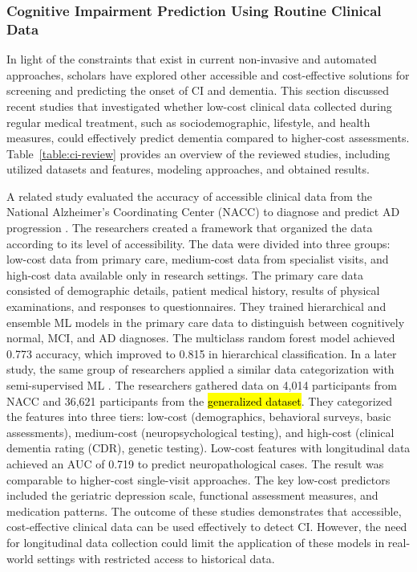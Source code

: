 \subsubsection{Cognitive Impairment Prediction Using Routine Clinical Data}
\label{sec:similar-studies}
In light of the constraints that exist in current non-invasive and automated approaches, scholars have explored other accessible and cost-effective solutions for screening and predicting the onset of CI and dementia. This section discussed recent studies that investigated whether low-cost clinical data collected during regular medical treatment, such as sociodemographic, lifestyle, and health measures, could effectively predict dementia compared to higher-cost assessments. Table~\ref{table:ci-review} provides an overview of the reviewed studies, including utilized datasets and features, modeling approaches, and obtained results.

A related study evaluated the accuracy of accessible clinical data from the National Alzheimer’s Coordinating Center (\acrshort{NACC}) to diagnose and predict AD progression \cite{Ren2023Improving}. The researchers created a framework that organized the data according to its level of accessibility. The data were divided into three groups: low-cost data from primary care, medium-cost data from specialist visits, and high-cost data available only in research settings. The primary care data consisted of demographic details, patient medical history, results of physical examinations, and responses to questionnaires. They trained hierarchical and ensemble ML models in the primary care data to distinguish between cognitively normal, MCI, and AD diagnoses. The multiclass random forest model achieved 0.773 accuracy, which improved to 0.815 in hierarchical classification. In a later study, the same group of researchers applied a similar data categorization with semi-supervised ML \cite{Ren2025Identifying}. The researchers gathered data on 4,014 participants from NACC and 36,621 participants from the \hl{generalized dataset}. They categorized the features into three tiers: low-cost (demographics, behavioral surveys, basic assessments), medium-cost (neuropsychological testing), and high-cost (clinical dementia rating (CDR), genetic testing). Low-cost features with longitudinal data achieved an AUC of 0.719 to predict neuropathological cases. The result was comparable to higher-cost single-visit approaches. The key low-cost predictors included the geriatric depression scale, functional assessment measures, and medication patterns. The outcome of these studies demonstrates that accessible, cost-effective clinical data can be used effectively to detect CI. However, the need for longitudinal data collection could limit the application of these models in real-world settings with restricted access to historical data.

